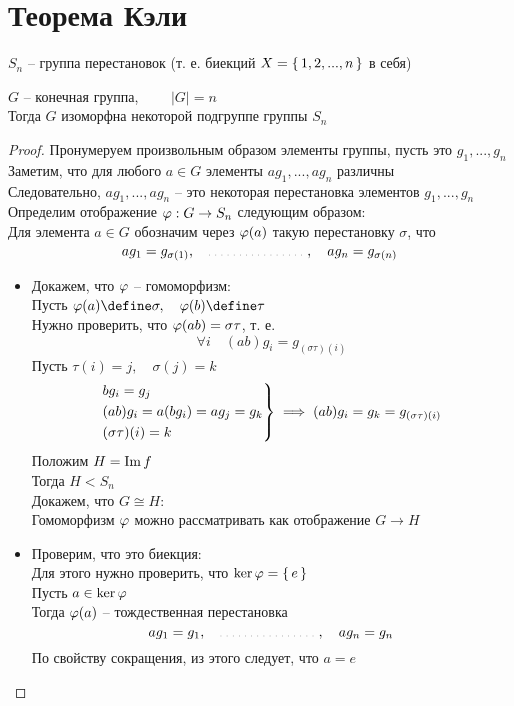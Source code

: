 \section{Теорема Кэли}

\begin{notation}
	$ S_n $ -- группа перестановок (т. е. биекций $ X = \set{1, 2, ..., n} $ в себя)
\end{notation}

\begin{theorem}
	$ G $ -- конечная группа, $ \qquad |G| = n $ \\
	Тогда $ G $ изоморфна некоторой подгруппе группы $ S_n $
\end{theorem}

\begin{proof}
	Пронумеруем произвольным образом элементы группы, пусть это $ g_1, ..., g_n $ \\
	Заметим, что для любого $ a \in G $ элементы $ ag_1, ..., ag_n $ различны \\
	Следовательно, $ ag_1, ..., ag_n $ -- это некоторая перестановка элементов $ g_1, ..., g_n $ \\
	Определим отображение $ \varphi : G \to S_n $ следующим образом: \\
	Для элемента $ a \in G $ обозначим через $ \varphi(a) $ такую перестановку $ \sigma $, что
	$$ ag_1 = g_{\sigma(1)}, \quad \widedots[7em], \quad ag_n = g_{\sigma(n)} $$
	\begin{itemize}
		\item Докажем, что $ \varphi $ -- гомоморфизм: \\
		Пусть $ \vphi(a) \define \sigma, \quad \vphi(b) \define \tau $ \\
		Нужно проверить, что $ \varphi(ab) = \sigma\tau $, т. е.
		$$ \forall i \quad (ab)g_i = g_{(\sigma\tau)(i)} $$
		Пусть $ \tau(i) = j, \quad \sigma(j) = k $
		$$
		\begin{rcases}
			bg_i = g_j \\
			(ab)g_i = a(bg_i) = ag_j = g_k \\
			(\sigma\tau)(i) = k
		\end{rcases} \implies (ab)g_i = g_k = g_{(\sigma\tau)(i)} $$
		Положим $ H = \operatorname{Im} f $ \\
		Тогда $ H < S_n $ \\
		Докажем, что $ G \cong H $: \\
		Гомоморфизм $ \varphi $ можно рассматривать как отображение $ G \to H $
		\item Проверим, что это биекция: \\
		Для этого нужно проверить, что $ \ker \varphi = \set{e} $ \\
		Пусть $ a \in \ker \varphi $ \\
		Тогда $ \varphi(a) $ -- тождественная перестановка
		$$ ag_1 = g_1, \quad \widedots[7em], \quad ag_n = g_n $$
		По свойству сокращения, из этого следует, что $ a = e $
	\end{itemize}
\end{proof}

